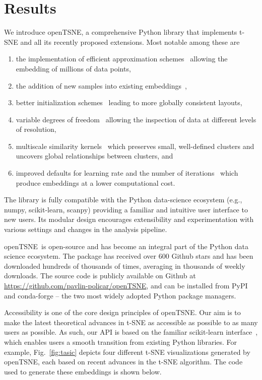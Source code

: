 \documentclass[twocolumn]{bmcart}
\newcommand{\opentsne}{\textsf{openTSNE}}
\begin{document}
\section*{Results}

We introduce \opentsne, a comprehensive Python library that implements t-SNE and all its recently proposed extensions. Most notable among these are
\begin{enumerate}
\item the implementation of efficient approximation schemes~\cite{van2014accelerating,linderman2019fast} allowing the embedding of millions of data points,
\item the addition of new samples into existing embeddings~\cite{policar2019embedding},
\item better initialization schemes~\cite{kobak2019umap} leading to more globally consistent layouts,
\item variable degrees of freedom~\cite{kobak2019heavy} allowing the inspection of data at different levels of resolution,
\item multiscale similarity kernels~\cite{kobak2019art} which preserves small, well-defined clusters and uncovers global relationships between clusters, and
\item improved defaults for learning rate and the number of iterations~\cite{belkina2019automated} which produce embeddings at a lower computational cost.
\end{enumerate}

The library is fully compatible with the Python data-science ecosystem (e.g., \textsf{numpy}, \textsf{scikit-learn}, \textsf{scanpy}) providing a familiar and intuitive user interface to new users. Its modular design encourages extensibility and experimentation with various settings and changes in the analysis pipeline.

\opentsne\ is open-source and has become an integral part of the Python data science ecosystem. The package has received over 600 Github stars and has been downloaded hundreds of thousands of times, averaging in thousands of weekly downloads. The source code is publicly available on Github at \url{https://github.com/pavlin-policar/openTSNE}, and can be installed from \textsf{PyPI} and \textsf{conda-forge} -- the two most widely adopted Python package managers.

Accessibility is one of the core design principles of \opentsne. Our aim is to make the latest theoretical advances in t-SNE as accessible as possible to as many users as possible. As such, our API is based on the familiar \textsf{scikit-learn} interface~\cite{sklearn_api}, which enables users a smooth transition from existing Python libraries. For example, Fig.~\ref{fig:tasic} depicts four different t-SNE visualizations generated by \opentsne, each based on recent advances in the t-SNE algorithm. The code used to generate these embeddings is shown below.
\end{document}
